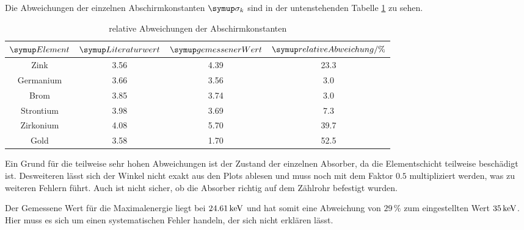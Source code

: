
Die Abweichungen der einzelnen Abschirmkonstanten $\su{\sigma_k}$ sind in der
untenstehenden Tabelle \ref{tab:abw} zu sehen.
\begin{table}
  \centering
  \begin{tabular}{c c c c }
    \toprule
    $\su{Element}$ & $\su{Literaturwert}$ & $\su{gemessener Wert}$ & $\su{relative Abweichung}/\%$ \\
    \midrule
    Zink       & 3.56 & 4.39 & 23.3 \\
    Germanium  & 3.66 & 3.56 &  3.0 \\
    Brom       & 3.85 & 3.74 &  3.0 \\
    Strontium  & 3.98 & 3.69 &  7.3 \\
    Zirkonium  & 4.08 & 5.70 & 39.7 \\
    Gold       & 3.58 & 1.70 & 52.5 \\
    \bottomrule
  \end{tabular}
  \caption{relative Abweichungen der Abschirmkonstanten}
  \label{tab:abw}
\end{table}
Ein Grund für die teilweise sehr hohen Abweichungen ist der Zustand der einzelnen
Absorber, da die Elementschicht teilweise beschädigt ist. Desweiteren lässt sich
der Winkel nicht exakt aus den Plots ablesen und muss noch mit dem Faktor $0.5$ multipliziert
werden, was zu weiteren Fehlern führt. Auch ist nicht
sicher, ob die Absorber richtig auf dem Zählrohr befestigt wurden.

Der Gemessene Wert für die Maximalenergie liegt bei $24.61\,\si{\kilo\electronvolt}$ und hat somit
eine Abweichung von $29\,\%$ zum eingestellten Wert $35\,\si{\kilo\electronvolt}$. Hier muss es sich
um einen systematischen Fehler handeln, der sich nicht erklären lässt.
